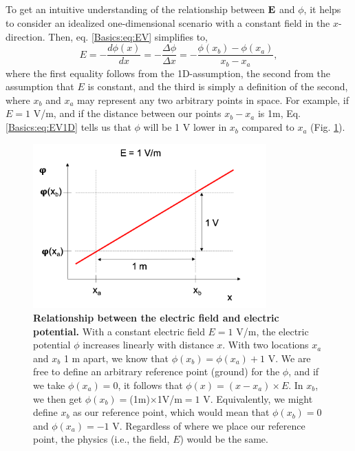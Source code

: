 \subsection{}
To get an intuitive understanding of the relationship between ${\bf E}$ and $\phi$, it helps to consider an idealized one-dimensional scenario with a constant field in the $x$-direction. Then, eq. \ref{Basics:eq:EV} simplifies to,
\begin{equation}
E = -\frac{d\phi(x)}{dx} = -\frac{\Delta \phi}{\Delta x} = -\frac{\phi(x_b)-\phi(x_a)}{x_b-x_a},
\label{Basics:eq:EV1D}
\end{equation}
where the first equality follows from the 1D-assumption, the second from the assumption that $E$ is constant, and the third is simply a definition of the second, where $x_b$ and $x_a$ may represent any two arbitrary points in space. For example, if $E = 1$ V/m, and if the distance between our points $x_b-x_a$ is 1m, Eq. \ref{Basics:eq:EV1D} tells us that $\phi$ will be 1 V  lower in $x_b$ compared to $x_a$ (Fig. \ref{Basics:fig:Ground}).

\begin{figure}[!ht]
\begin{center}
\includegraphics[width=0.8\textwidth]{Figures/Basics/Ground.png}
\end{center}
\caption{\textbf{Relationship between the electric field and electric potential.} With a constant electric field $E = 1$ V/m, the electric potential $\phi$ increases linearly with distance $x$. With two locations $x_a$ and $x_b$ 1 m apart, we know that $\phi(x_b) = \phi(x_a) + 1$ V. We are free to define an arbitrary reference point (ground) for the $\phi$, and if we take $\phi(x_a) = 0$, it follows that $\phi(x) = (x-x_a) \times E$. In $x_b$, we then get $\phi(x_b)=$(1m)$\times$1V/m$=1$ V. Equivalently, we might define $x_b$ as our reference point, which would mean that $\phi(x_b) = 0$ and $\phi(x_a) = -1$ V. Regardless of where we place our reference point, the physics (i.e., the field, $E$) would be the same.
}
\label{Basics:fig:Ground}
\end{figure}

